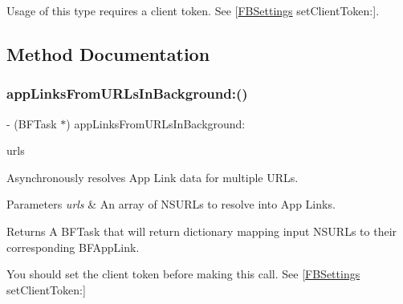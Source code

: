 Usage of this type requires a client token. See {\ttfamily \mbox{[}\hyperlink{interfaceFBSettings}{F\+B\+Settings} set\+Client\+Token\+:\mbox{]}}. 

\subsection{Method Documentation}
\mbox{\label{interfaceFBAppLinkResolver_aefdaa81da8bc6105172f4f2632c12daa}} 
\subsubsection{\texorpdfstring{app\+Links\+From\+U\+R\+Ls\+In\+Background\+:()}{appLinksFromURLsInBackground:()}\hspace{0.1cm}{\footnotesize\ttfamily [1/5]}}
{\footnotesize\ttfamily -\/ (B\+F\+Task $\ast$) app\+Links\+From\+U\+R\+Ls\+In\+Background\+: \begin{DoxyParamCaption}\item[{(N\+S\+Array $\ast$)}]{urls }\end{DoxyParamCaption}}

Asynchronously resolves App Link data for multiple U\+R\+Ls.


\begin{DoxyParams}{Parameters}
{\em urls} & An array of N\+S\+U\+R\+Ls to resolve into App Links. \\
\hline
\end{DoxyParams}
\begin{DoxyReturn}{Returns}
A B\+F\+Task that will return dictionary mapping input N\+S\+U\+R\+Ls to their corresponding B\+F\+App\+Link.
\end{DoxyReturn}
You should set the client token before making this call. See {\ttfamily \mbox{[}\hyperlink{interfaceFBSettings}{F\+B\+Settings} set\+Client\+Token\+:\mbox{]}} \mbox{\label{interfaceFBAppLinkResolver_aefdaa81da8bc6105172f4f2632c12daa}} 
